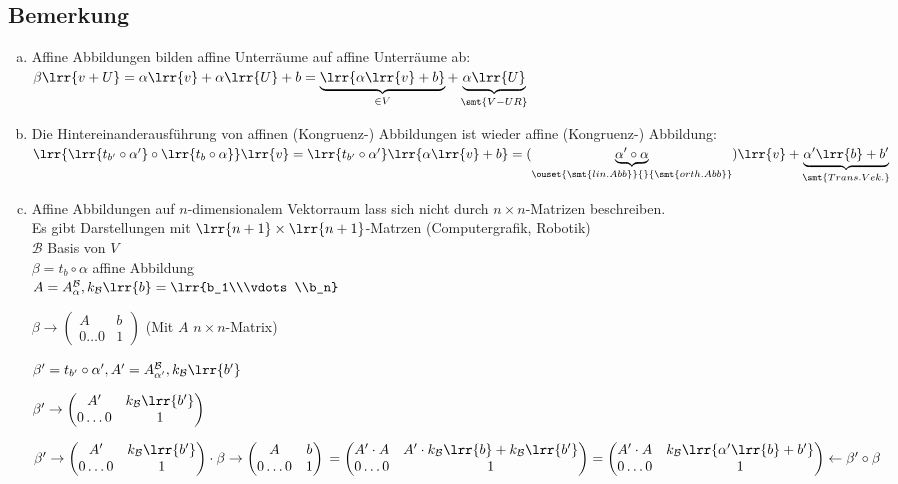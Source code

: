 \subsection{Bemerkung}
	\begin{enumerate}[a)]
		\item Affine Abbildungen bilden affine Unterräume auf affine Unterräume ab:\\
			$\beta\lrr{v+U}=\alpha\lrr{v}+\alpha\lrr{U}+b =\underbrace{\lrr{\alpha\lrr{v}+b}}_{\in V}+\underbrace{\alpha\lrr{U}}_{\smt{V-UR}}$
		\item Die Hintereinanderausführung von affinen (Kongruenz-) Abbildungen ist wieder affine (Kongruenz-) Abbildung:\\
			$\lrr{\lrr{t_{b'}\circ\alpha'}\circ\lrr{t_b\circ\alpha}}\lrr{v}=\lrr{t_{b'}\circ\alpha'}\lrr{\alpha\lrr{v}+b}=(\underbrace{\alpha'\circ\alpha}_{\ouset{\smt{lin.Abb}}{}{\smt{orth. Abb}}})\lrr{v}+\underbrace{\alpha'\lrr{b}+b'}_{\smt{Trans. Vek.}}$
		\item Affine Abbildungen auf $n$-dimensionalem Vektorraum lass sich nicht durch $n\times n$-Matrizen beschreiben.\\
			Es gibt Darstellungen mit $\lrr{n+1}\times\lrr{n+1}$-Matrzen (Computergrafik, Robotik)\\
			$\mathcal{B}$ Basis von $V$\\
			$\beta=t_b\circ\alpha$ affine Abbildung\\
			$A=A_\alpha^\mathcal{B}, k_\mathcal{B}\lrr{b}=\lrr{b_1\\\vdots\\b_n}$
			
			$\beta\rightarrow\begin{pmatrix}
				A&b\\0\dots 0&1
			\end{pmatrix}$ (Mit $A$ $n\times n$-Matrix)
			
			$\beta'=t_{b'}\circ\alpha', A'=A_{\alpha'}^\mathcal{B}, k_\mathcal{B}\lrr{b'}$
			
			$\beta'\rightarrow\begin{pmatrix}
				A'&k_\mathcal{B}\lrr{b'}\\0\dots 0&1
			\end{pmatrix}$
			
			$\beta'\rightarrow\begin{pmatrix}
				A'&k_\mathcal{B}\lrr{b'}\\0\dots 0&1
			\end{pmatrix}
			\cdot
			\beta\rightarrow\begin{pmatrix}
				A&b\\0\dots 0&1
			\end{pmatrix}\\
			=\begin{pmatrix}
				A'\cdot A&A'\cdot k_\mathcal{B}\lrr{b}+k_\mathcal{B}\lrr{b'}\\0\dots 0&1
			\end{pmatrix}
			=\begin{pmatrix}
				A'\cdot A&k_\mathcal{B}\lrr{\alpha'\lrr{b}+b'}\\0\dots 0&1
			\end{pmatrix}
			\leftarrow \beta'\circ\beta$
			

\end{enumerate}
